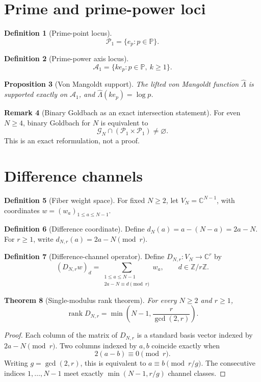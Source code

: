 \documentclass[11pt]{article}
\newtheorem{theorem}{Theorem}[section]
\newtheorem{proposition}[theorem]{Proposition}
\theoremstyle{definition}
\newtheorem{definition}[theorem]{Definition}
\newtheorem{remark}[theorem]{Remark}
\newcommand{\C}{\mathbb C}
\newcommand{\Z}{\mathbb Z}
\newcommand{\Pp}{\mathbb P}
\newcommand{\G}{\mathcal G}
\newcommand{\A}{\mathcal A}
\newcommand{\rank}{\operatorname{rank}}
\begin{document}
\section{Prime and prime-power loci}
\begin{definition}[Prime-point locus]
\[
\mathcal P_1=\{e_p:p\in\Pp\}.
\]
\end{definition}
\begin{definition}[Prime-power axis locus]
\[
\A_1=\{k e_p:p\in\Pp,\ k\ge1\}.
\]
\end{definition}
\begin{proposition}[Von Mangoldt support]
The lifted von Mangoldt function $\widehat\Lambda$ is supported exactly on $\A_1$, and $\widehat\Lambda(k e_p)=\log p$.
\end{proposition}

\begin{remark}[Binary Goldbach as an exact intersection statement]
For even $N\ge4$, binary Goldbach for $N$ is equivalent to
\[
\G_N\cap(\mathcal P_1\times\mathcal P_1)\ne\varnothing.
\]
This is an exact reformulation, not a proof.
\end{remark}

\section{Difference channels}
\begin{definition}[Fiber weight space]
For fixed $N\ge2$, let $V_N=\C^{N-1}$, with coordinates $w=(w_a)_{1\le a\le N-1}$.
\end{definition}
\begin{definition}[Difference coordinate]
Define $d_N(a)=a-(N-a)=2a-N$. For $r\ge1$, write $d_{N,r}(a)=2a-N\pmod r$.
\end{definition}
\begin{definition}[Difference-channel operator]
Define $D_{N,r}:V_N\to\C^r$ by
\[
(D_{N,r}w)_d=\sum_{\substack{1\le a\le N-1\\2a-N\equiv d\pmod r}}w_a,
\qquad d\in\Z/r\Z.
\]
\end{definition}

\begin{theorem}[Single-modulus rank theorem]\label{thm:single-rank}
For every $N\ge2$ and $r\ge1$,
\[
\rank D_{N,r}=\min\!\left(N-1,\frac r{\gcd(2,r)}\right).
\]
\end{theorem}
\begin{proof}
Each column of the matrix of $D_{N,r}$ is a standard basis vector indexed by $2a-N\pmod r$. Two columns indexed by $a,b$ coincide exactly when
\[
2(a-b)\equiv0\pmod r.
\]
Writing $g=\gcd(2,r)$, this is equivalent to $a\equiv b\pmod{r/g}$. The consecutive indices $1,\dots,N-1$ meet exactly $\min(N-1,r/g)$ channel classes.
\end{proof}
\end{document}
